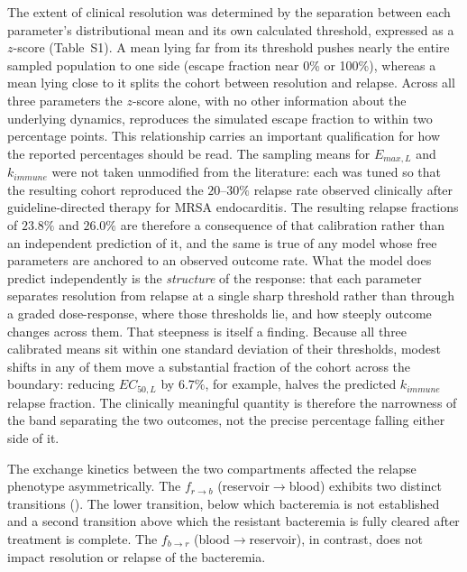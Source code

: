 \documentclass[12pt, draftcls, onecolumn]{IEEEtran}
\begin{document}
The extent of clinical resolution was determined by the separation between each parameter's distributional mean and its own calculated threshold, expressed as a $z$-score (Table~S1). A mean lying far from its threshold pushes nearly the entire sampled population to one side (escape fraction near 0\% or 100\%), whereas a mean lying close to it splits the cohort between resolution and relapse. Across all three parameters the $z$-score alone, with no other information about the underlying dynamics, reproduces the simulated escape fraction to within two percentage points. This relationship carries an important qualification for how the reported percentages should be read. The sampling means for $E_{max,L}$ and $k_{immune}$ were not taken unmodified from the literature: each was tuned so that the resulting cohort reproduced the $20$--$30\%$ relapse rate observed clinically after guideline-directed therapy for MRSA endocarditis. The resulting relapse fractions of $23.8\%$ and $26.0\%$ are therefore a consequence of that calibration rather than an independent prediction of it, and the same is true of any model whose free parameters are anchored to an observed outcome rate. What the model does predict independently is the \emph{structure} of the response: that each parameter separates resolution from relapse at a single sharp threshold rather than through a graded dose-response, where those thresholds lie, and how steeply outcome changes across them. That steepness is itself a finding. Because all three calibrated means sit within one standard deviation of their thresholds, modest shifts in any of them move a substantial fraction of the cohort across the boundary: reducing $EC_{50,L}$ by $6.7\%$, for example, halves the predicted $k_{immune}$ relapse fraction. The clinically meaningful quantity is therefore the narrowness of the band separating the two outcomes, not the precise percentage falling either side of it.


The exchange kinetics between the two compartments affected the
relapse phenotype asymmetrically.  The $f_{r \to b}$ (reservoir$\to$blood) exhibits two distinct transitions (). The lower transition, below which  bacteremia is not established and a second transition above which the resistant bacteremia is fully cleared after treatment is complete. The $f_{b \to r}$ (blood$\to$reservoir), in contrast, does not impact resolution or relapse of the bacteremia.
\end{document}
